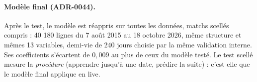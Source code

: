 \paragraph{Modèle final (ADR-0044).} Après le test, le modèle est réappris sur toutes les données,
matchs scellés compris : 40 180 lignes du 7 août 2015 au 18 octobre 2026, même structure et mêmes
13 variables, demi-vie de 240 jours choisie par la même validation interne. Ses coefficients
s'écartent de \(0{,}009\) au plus de ceux du modèle testé. Le test scellé mesure la \emph{procédure}
(apprendre jusqu'à une date, prédire la suite) : c'est elle que le modèle final applique en live.
